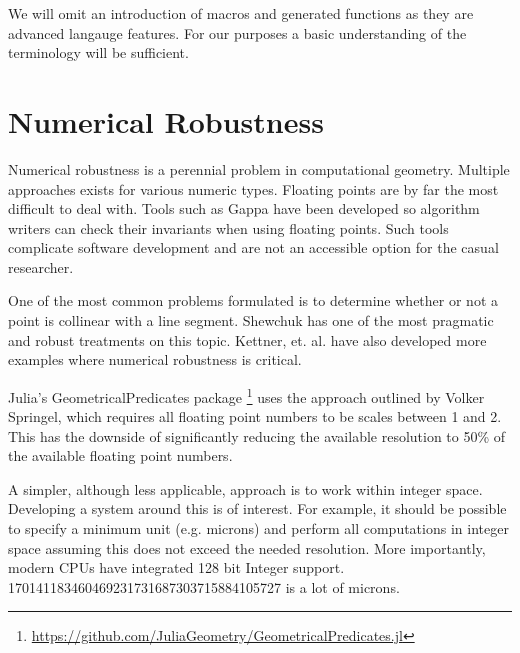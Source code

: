 We will omit an introduction of macros and generated functions
as they are advanced langauge
features. For our purposes a basic understanding of the terminology will
be sufficient.


\section{Numerical Robustness}

Numerical robustness is a perennial problem in computational geometry\cite{Shamos_1999}.
Multiple
approaches exists for various numeric types. Floating points are by far
the most difficult to deal with. Tools such as Gappa have been developed so
algorithm writers can check their invariants when using floating points\cite{Gappa}.
Such tools complicate software development and are not an accessible option
for the casual researcher.

One of the most common problems formulated is to determine whether or not a
point is collinear with a line segment. Shewchuk has one of the most pragmatic
and robust treatments on this topic\cite{Shewchuk}. Kettner, et. al. have also
developed more examples where numerical robustness is critical\cite{Kettner_Mehlhorn_Pion_Schirra_Yap_2008}.

Julia's GeometricalPredicates package \footnote{\url{https://github.com/JuliaGeometry/GeometricalPredicates.jl}}
uses the approach outlined by Volker Springel, which requires all floating point
numbers to be scales between 1 and 2\cite{Springel_2010}. This has the downside
of significantly reducing the available resolution to 50\% of the available
floating point numbers.

A simpler, although less applicable, approach is to work
within integer space. Developing a system around this is of interest. For
example, it should be possible to specify a minimum unit (e.g. microns)
and perform all computations in integer space assuming this does not exceed
the needed resolution. More importantly, modern CPUs have integrated 128 bit
Integer support. 170141183460469231731687303715884105727 is a lot of microns.



